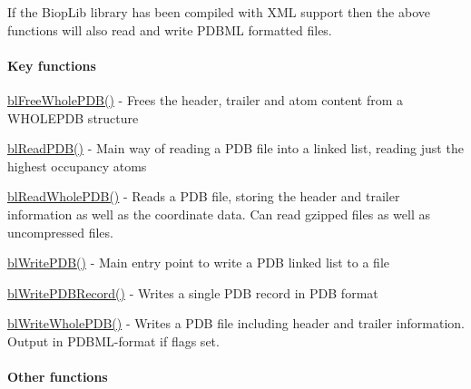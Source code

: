If the Biop\-Lib library has been compiled with X\-M\-L support then the above functions will also read and write P\-D\-B\-M\-L formatted files.

\paragraph*{Key functions}


\begin{DoxyItemize}
\item \hyperlink{pdb_8h_aeee33316d776fc479c656a3f9f0c7a84}{bl\-Free\-Whole\-P\-D\-B()} -\/ Frees the header, trailer and atom content from a W\-H\-O\-L\-E\-P\-D\-B structure
\item \hyperlink{pdb_8h_a4027e61f67886772894d7a948a3be2c0}{bl\-Read\-P\-D\-B()} -\/ Main way of reading a P\-D\-B file into a linked list, reading just the highest occupancy atoms
\item \hyperlink{pdb_8h_aac630c13aff6802b905c10ce97d64761}{bl\-Read\-Whole\-P\-D\-B()} -\/ Reads a P\-D\-B file, storing the header and trailer information as well as the coordinate data. Can read gzipped files as well as uncompressed files.
\item \hyperlink{pdb_8h_a55086bc1125dc7baa000bf42ddcf5930}{bl\-Write\-P\-D\-B()} -\/ Main entry point to write a P\-D\-B linked list to a file
\item \hyperlink{pdb_8h_ad3bc6ad58dd19e3a2e854404b88b9271}{bl\-Write\-P\-D\-B\-Record()} -\/ Writes a single P\-D\-B record in P\-D\-B format
\item \hyperlink{pdb_8h_a41023286849e00cae2fbe0a6c89118f2}{bl\-Write\-Whole\-P\-D\-B()} -\/ Writes a P\-D\-B file including header and trailer information. Output in P\-D\-B\-M\-L-\/format if flags set.
\end{DoxyItemize}

\paragraph*{Other functions}


